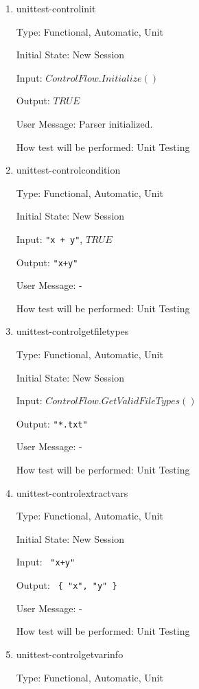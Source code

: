 \documentclass[12pt, titlepage]{article}
\begin{document}
\begin{enumerate}
	
	\item{unittest-controlinit}
	
	Type: Functional, Automatic, Unit
	
	Initial State: New Session
	
	Input: $ControlFlow.Initialize()$
	
	Output: $TRUE$
	
	User Message: Parser initialized.
	
	How test will be performed: Unit Testing\\
	
	\item{unittest-controlcondition}
	
	Type: Functional, Automatic, Unit
	
	Initial State: New Session
	
	Input: \texttt{"x + y"}, $TRUE$
	
	Output: \texttt{"x+y"}
	
	User Message: -
	
	How test will be performed: Unit Testing\\
	
	\item{unittest-controlgetfiletypes}
	
	Type: Functional, Automatic, Unit
	
	Initial State: New Session
	
	Input: $ControlFlow.GetValidFileTypes()$
	
	Output: \texttt{"*.txt"}
	
	User Message: -
	
	How test will be performed: Unit Testing\\
	
	\item{unittest-controlextractvars}
	
	Type: Functional, Automatic, Unit
	
	Initial State: New Session
	
	Input: \texttt{ "x+y" }
	
	Output: \texttt{ \{ "x", "y" \}}
	
	User Message: -
	
	How test will be performed: Unit Testing\\
	
	\item{unittest-controlgetvarinfo}
	
	Type: Functional, Automatic, Unit
	

\end{enumerate}
\end{document}
